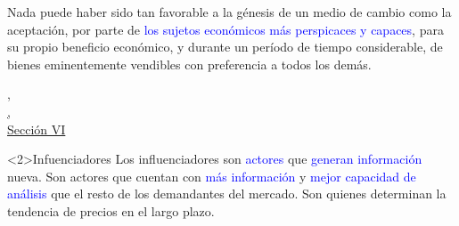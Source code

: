 \begin{frame}

\begin{displayquote}
\small
Nada puede haber sido tan favorable a la génesis de un medio de cambio como la aceptación, por parte de \textcolor{blue}{los sujetos económicos más perspicaces y capaces}, para su propio beneficio económico, y durante un período de tiempo considerable, de bienes eminentemente vendibles con preferencia a todos los demás. 
\end{displayquote}
\raggedleft \href{https://www.jstor.org/stable/2956146}{\cite{Menger1892},\\ ,\\Sección VI}

\vspace{5mm}
\begin{block}<2>{Infuenciadores}
Los \textcolor{dgreen}{influenciadores} son \textcolor{blue}{actores} que \textcolor{blue}{generan información} nueva. Son actores que cuentan con \textcolor{blue}{más información} y \textcolor{blue}{mejor capacidad de análisis} que el resto de los demandantes del mercado. Son quienes determinan la tendencia de precios en el largo plazo. 
\end{block}

    
\end{frame}


